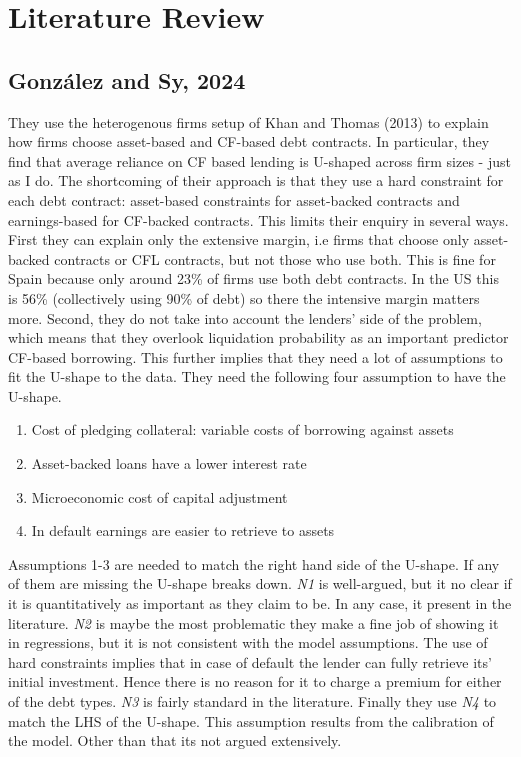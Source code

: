 \documentclass[12pt]{article}
\begin{document}
\section*{Literature Review}
\subsection*{González and Sy, 2024 \checkmark}
They use the heterogenous firms setup of Khan and Thomas (2013) to explain how firms choose asset-based and CF-based debt contracts. In particular, they find that average reliance on CF based lending is U-shaped across firm sizes - just as I do. The shortcoming of their approach is that they use a hard constraint for each debt contract: asset-based constraints for asset-backed contracts and earnings-based for CF-backed contracts. This limits their enquiry in several ways. First they can explain only the extensive margin, i.e firms that choose only asset-backed contracts or CFL contracts, but not those who use both. This is fine for Spain because only around 23\% of firms use both debt contracts. In the US this is 56\% (collectively using 90\% of debt) so there the intensive margin matters more. Second, they do not take into account the lenders' side of the problem, which means that they overlook liquidation probability as an important predictor CF-based borrowing. This further implies that they need a lot of assumptions to fit the U-shape to the data. They need the following four assumption to have the U-shape. 
\begin{enumerate} \setlength\itemsep{0em} 
    \item Cost of pledging collateral: variable costs of borrowing against assets
    \item Asset-backed loans have a lower interest rate 
    \item Microeconomic cost of capital adjustment
    \item In default earnings are easier to retrieve to assets
\end{enumerate}
Assumptions 1-3 are needed to match the right hand side of the U-shape. If any of them are missing the U-shape breaks down. \textit{N1} is well-argued, but it no clear if it is quantitatively as important as they claim to be. In any case, it present in the literature. \textit{N2} is maybe the most problematic they make a fine job of showing it in regressions, but it is not consistent with the model assumptions. The use of hard constraints implies that in case of default the lender can fully retrieve its' initial investment. Hence there is no reason for it to charge a premium for either of the debt types. \textit{N3} is fairly standard in the literature. Finally they use \textit{N4} to match the LHS of the U-shape. This assumption results from the calibration of the model. Other than that its not argued extensively. \vspace{3mm} \\
\end{document}
